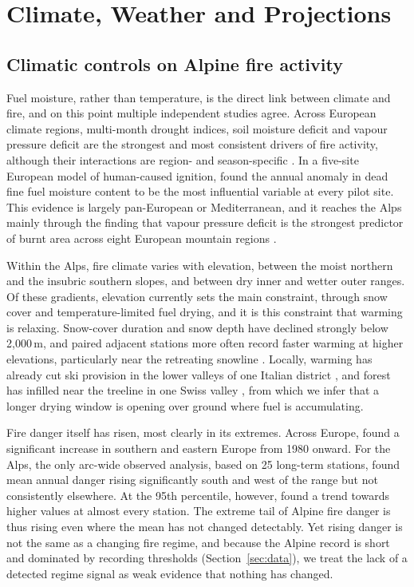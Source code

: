 \documentclass[11pt,a4paper]{article}
\begin{document}
\section{Climate, Weather and Projections}
\label{sec:climate}

\subsection{Climatic controls on Alpine fire activity}

Fuel moisture, rather than temperature, is the direct link between climate and fire, and on this point multiple independent studies agree. Across European climate regions, multi-month drought indices, soil moisture deficit and vapour pressure deficit are the strongest and most consistent drivers of fire activity, although their interactions are region- and season-specific \citep{miller_compounding_2025, venalainen_temporal_2014, ruffault_extreme_2018}. In a five-site European model of human-caused ignition, \citet{gelabert_assessing_2025} found the annual anomaly in dead fine fuel moisture content to be the most influential variable at every pilot site. This evidence is largely pan-European or Mediterranean, and it reaches the Alps mainly through the finding that vapour pressure deficit is the strongest predictor of burnt area across eight European mountain regions \citep{beloiu_climatedriven_2026}.

Within the Alps, fire climate varies with elevation, between the moist northern and the insubric southern slopes, and between dry inner and wetter outer ranges. Of these gradients, elevation currently sets the main constraint, through snow cover and temperature-limited fuel drying, and it is this constraint that warming is relaxing. Snow-cover duration and snow depth have declined strongly below 2{,}000\,m, and paired adjacent stations more often record faster warming at higher elevations, particularly near the retreating snowline \citep{rangwala_climate_2012, pepin_climate_2022}. Locally, warming has already cut ski provision in the lower valleys of one Italian district \citep{pede_mountain_2022}, and forest has infilled near the treeline in one Swiss valley \citep{frei_evidence_2023}, from which we infer that a longer drying window is opening over ground where fuel is accumulating.

Fire danger itself has risen, most clearly in its extremes. Across Europe, \citet{venalainen_temporal_2014} found a significant increase in southern and eastern Europe from 1980 onward. For the Alps, the only arc-wide observed analysis, based on 25 long-term stations, found mean annual danger rising significantly south and west of the range but not consistently elsewhere. At the 95th percentile, however, \citet{wastl_recent_2012} found a trend towards higher values at almost every station. The extreme tail of Alpine fire danger is thus rising even where the mean has not changed detectably. Yet rising danger is not the same as a changing fire regime, and because the Alpine record is short and dominated by recording thresholds (Section~\ref{sec:data}), we treat the lack of a detected regime signal as weak evidence that nothing has changed.
\end{document}
